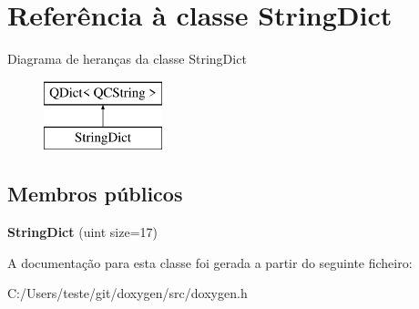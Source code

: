 \hypertarget{class_string_dict}{\section{Referência à classe String\-Dict}
\label{class_string_dict}
}
Diagrama de heranças da classe String\-Dict\begin{figure}[H]
\begin{center}
\leavevmode
\includegraphics[height=2.000000cm]{class_string_dict}
\end{center}
\end{figure}
\subsection*{Membros públicos}
\begin{DoxyCompactItemize}
\item 
\hypertarget{class_string_dict_a5787345f1346270ff9681bd20bdeb615}{{\bfseries String\-Dict} (uint size=17)}\label{class_string_dict_a5787345f1346270ff9681bd20bdeb615}

\end{DoxyCompactItemize}


A documentação para esta classe foi gerada a partir do seguinte ficheiro\-:\begin{DoxyCompactItemize}
\item 
C\-:/\-Users/teste/git/doxygen/src/doxygen.\-h\end{DoxyCompactItemize}

